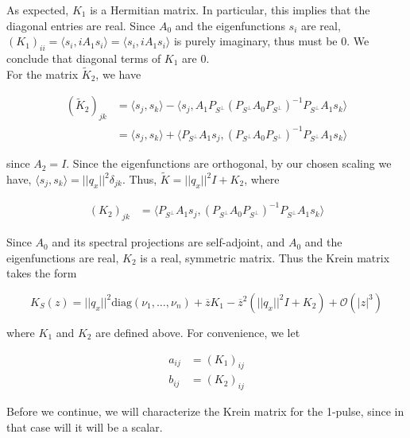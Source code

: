 \documentclass[12pt]{article}
\begin{document}
As expected, $K_1$ is a Hermitian matrix. In particular, this implies that the diagonal entries are real. Since $A_0$ and the eigenfunctions $s_i$ are real, $(K_1)_{ii} = \langle s_i, i A_1 s_i \rangle = \langle s_i, i A_1 s_i \rangle$ is purely imaginary, thus must be 0. We conclude that diagonal terms of $K_1$ are 0.\\

For the matrix $\tilde{K}_2$, we have 

\begin{align*}
(\tilde{K}_2)_{jk} &= \langle s_j, s_k \rangle - \langle s_j, A_1 P_{S^\perp} (P_{S^\perp} A_0 P_{S^\perp})^{-1} P_{S^\perp} A_1 s_k  \rangle \\
&= \langle s_j, s_k \rangle + \langle P_{S^\perp} A_1 s_j, (P_{S^\perp} A_0 P_{S^\perp})^{-1} P_{S^\perp} A_1 s_k  \rangle
\end{align*}

since $A_2 = I$. Since the eigenfunctions are orthogonal, by our chosen scaling we have, $\langle s_j, s_k \rangle = ||q_x||^2 \delta_{jk}$. Thus, $\tilde{K} = ||q_x||^2 I + K_2$, where

\begin{align*}
(K_2)_{jk} &= 
\langle P_{S^\perp} A_1 s_j, (P_{S^\perp} A_0 P_{S^\perp})^{-1} P_{S^\perp} A_1 s_k \rangle
\end{align*}

Since $A_0$ and its spectral projections are self-adjoint, and $A_0$ and the eigenfunctions are real, $K_2$ is a real, symmetric matrix. Thus the Krein matrix takes the form

\begin{equation}\label{Kreinform}
K_S(z) = ||q_x||^2 \text{diag}(\nu_1, \dots, \nu_n) + \overline{z} K_1 
- \overline{z}^2 ( ||q_x||^2 I + K_2) + \mathcal{O}(|z|^3)
\end{equation}

where $K_1$ and $K_2$ are defined above. For convenience, we let

\begin{align*}
a_{ij} &= (K_1)_{ij} \\
b_{ij} &= (K_2)_{ij}
\end{align*}

Before we continue, we will characterize the Krein matrix for the 1-pulse, since in that case will it will be a scalar.

\end{document}
